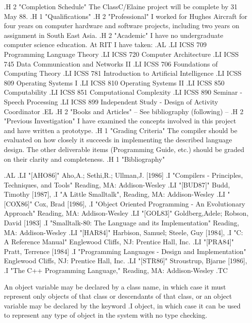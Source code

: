 .H 2 "Completion Schedule"
The ClassC/Elaine project will be complete by 31 May 88.
.H 1 "Qualifications"
.H 2 "Professional"
I worked for Hughes Aircraft for four years on computer hardware and
software projects, including two years on assignment in South East Asia.
.H 2 "Academic"
I have no undergraduate computer science education.  At RIT I have taken:
.AL
.LI
ICSS 709	Programming Language Theory
.LI
ICSS 720	Computer Architecture
.LI
ICSS 745	Data Communication and Networks II
.LI
ICSS 706	Foundations of Computing Theory
.LI
ICSS 781	Introduction to Artificial Intelligence
.LI
ICSS 809	Operating Systems I
.LI
ICSS 810	Operating Systems II
.LI
ICSS 850	Computability
.LI
ICSS 851	Computational Complexity
.LI
ICSS 890	Seminar - Speech Processing
.LI
ICSS 899	Independent Study - Design of Activity Coordinator
.EL
.H 2 "Books and Articles"
-- See bibliography (following) --
.H 2 "Previous Investigation"
I have examined the concepts involved in this project and have written
a prototype.
.H 1 "Grading Criteria"
The compiler should be evaluated on how closely it succeeds in implementing
the described language design.  The other deliverable items (Programming
Guide, etc.) should be graded on their clarity and completeness.
.H 1 "Bibliography"

.AL
.LI "[AHO86]"
Aho,A.; Sethi,R.; Ullman,J. [1986]
.I "Compilers - Principles, Techniques, and Tools"
Reading, MA: Addison-Wesley
.LI "[BUD87]"
Budd, Timothy [1987],
.I "A Little Smalltalk",
Reading, MA: Addison-Wesley
.LI "[COX86]"
Cox, Brad [1986],
.I "Object Oriented Programming - An Evolutionary Approach"
Reading, MA: Addison-Wesley
.LI "[GOL83]"
Goldberg,Adele; Robson, David [1983]
.I "Smalltalk-80: The Language and its Implementation"
Reading, MA: Addison-Wesley
.LI "[HAR84]"
Harbison, Samuel; Steele, Guy [1984],
.I "C: A Reference Manual"
Englewood Cliffs, NJ: Prentice Hall, Inc.
.LI "[PRA84]"
Pratt, Terrence [1984]
.I "Programming Languages - Design and Implementation"
Englewood Cliffs, NJ: Prentice Hall, Inc.
.LI "[STR86]"
Stroustrup, Bjarne [1986],
.I "The C++ Programming Language,"
Reading, MA: Addison-Wesley
.TC

An object variable may be declared by a class name,
in which case it must represent only objects of that class or descendants
of that class, or an object variable may be declared by the keyword
.I object,
in which case it can be used to represent any type of object in
the system with no type checking.


